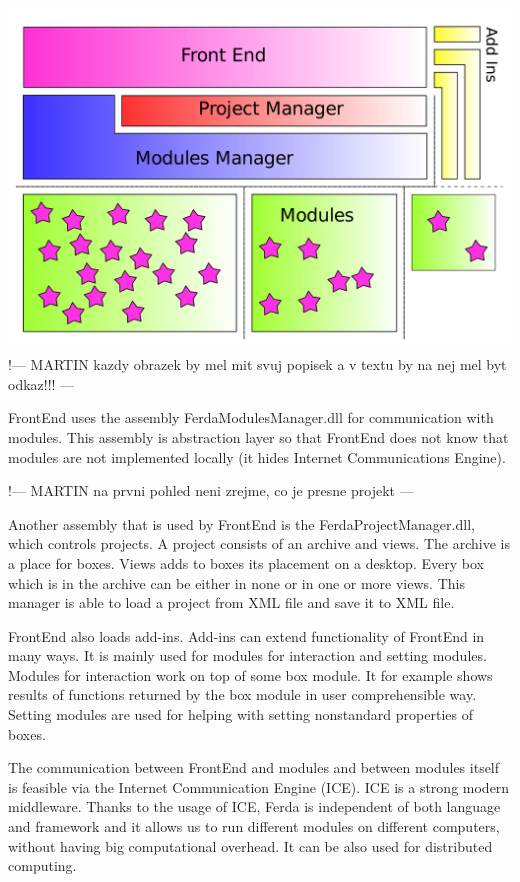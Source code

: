 \documentclass[a4paper,12pt]{book}
\begin{document}
\noindent\includegraphics[width=1\textwidth]{designB}
!--- MARTIN kazdy obrazek by mel mit svuj popisek a v textu by na nej mel byt odkaz!!! ---

FrontEnd uses the assembly FerdaModulesManager.dll for communication with modules. This assembly is abstraction layer so that FrontEnd does not know that modules are not implemented locally (it hides Internet Communications Engine).

!--- MARTIN na prvni pohled neni zrejme, co je presne projekt ---

Another assembly that is used by FrontEnd is the FerdaProjectManager.dll, which controls projects. A project consists of an archive and views. The archive is a place for boxes. Views adds to boxes its placement on a desktop. Every box which is in the archive can be either in none or in one or more views. This manager is able to load a project from XML file and save it to XML file.

FrontEnd also loads add-ins. Add-ins can extend functionality of FrontEnd in many ways. It is mainly used for modules for interaction and setting modules. Modules for interaction work on top of some box module. It for example shows results of functions returned by the box module in user comprehensible way. Setting modules are used for helping with setting nonstandard properties of boxes.

The communication between FrontEnd and modules and between modules itself is feasible via the Internet Communication Engine (ICE). ICE is a strong modern middleware. Thanks to the usage of ICE, Ferda is independent of both language and framework and it allows us to run different modules on different computers, without having big computational overhead. It can be also used for distributed computing.
\end{document}
